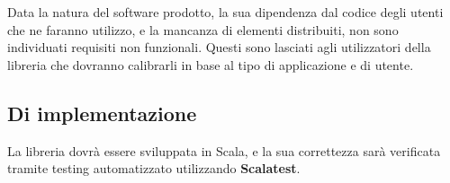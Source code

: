 Data la natura del software prodotto, la sua dipendenza dal codice degli utenti che ne faranno utilizzo, e la mancanza di elementi distribuiti, non sono individuati requisiti non funzionali.
%
Questi sono lasciati agli utilizzatori della libreria che dovranno calibrarli in base al tipo di applicazione e di utente.

\subsection{Di implementazione}

La libreria dovrà essere sviluppata in Scala, e la sua correttezza sarà verificata tramite testing automatizzato utilizzando \textbf{Scalatest}.